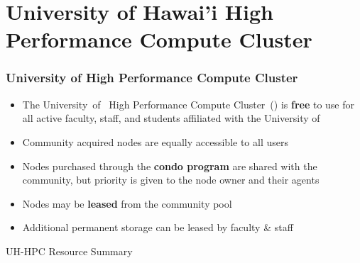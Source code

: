 \section[University of Hawai'i High Performance Compute Cluster]{University of Hawai'i High Performance Compute Cluster}
\begin{frame}
    \frametitle{University of {\hawaii} High Performance Compute Cluster}
    \begin{itemize}
    \item The University~of~{\hawaii} High Performance Compute Cluster~({\uhhpc}) is \textbf{free} to use for all active faculty, staff, and students affiliated with the University of {\hawaii}
    \item Community acquired nodes are equally accessible to all users
    \item Nodes purchased through the {\textbf{condo program}} are shared with the community, but priority is given to the node owner and their agents
		\item Nodes may be {\textbf{leased}} from the community pool
		\item Additional permanent storage can be leased by faculty \& staff
    \end{itemize}
		\begin{block}{UH-HPC Resource Summary}
  \begin{table}
    \centering
  \end{table}
	\end{block}
\end{frame}

